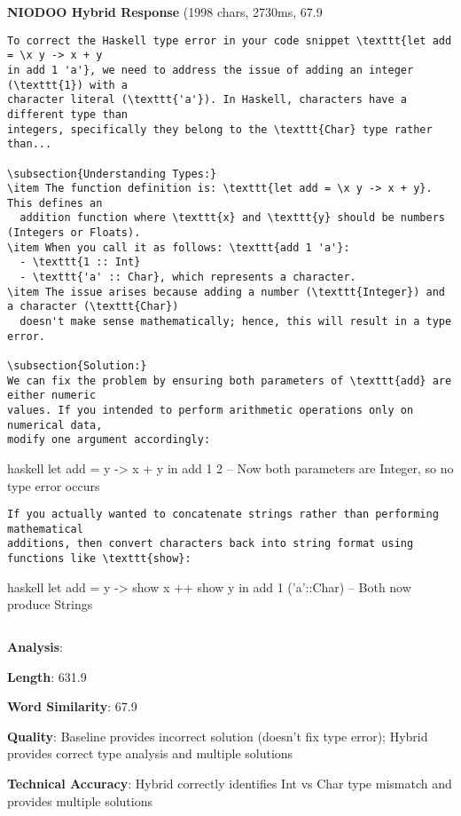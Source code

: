\documentclass[11pt,a4paper]{article}
\begin{document}
\textbf{NIODOO Hybrid Response} (1998 chars, 2730ms, 67.9%
\begin{verbatim}To correct the Haskell type error in your code snippet \texttt{let add = \x y -> x + y 
in add 1 'a'}, we need to address the issue of adding an integer (\texttt{1}) with a 
character literal (\texttt{'a'}). In Haskell, characters have a different type than 
integers, specifically they belong to the \texttt{Char} type rather than...

\subsection{Understanding Types:}
\item The function definition is: \texttt{let add = \x y -> x + y}. This defines an 
  addition function where \texttt{x} and \texttt{y} should be numbers (Integers or Floats).
\item When you call it as follows: \texttt{add 1 'a'}:
  - \texttt{1 :: Int}
  - \texttt{'a' :: Char}, which represents a character.
\item The issue arises because adding a number (\texttt{Integer}) and a character (\texttt{Char}) 
  doesn't make sense mathematically; hence, this will result in a type error.

\subsection{Solution:}
We can fix the problem by ensuring both parameters of \texttt{add} are either numeric 
values. If you intended to perform arithmetic operations only on numerical data, 
modify one argument accordingly:

\end{verbatim}haskell
let add = \x y -> x + y
in add 1 2  -- Now both parameters are Integer, so no type error occurs
\begin{verbatim}
If you actually wanted to concatenate strings rather than performing mathematical 
additions, then convert characters back into string format using functions like \texttt{show}:
\end{verbatim}haskell
let add = \x y -> show x ++ show y
in add 1 ('a'::Char)  -- Both now produce Strings
\begin{verbatim}\end{verbatim}

\textbf{Analysis}:
\item \textbf{Length}: 631.9%
\item \textbf{Word Similarity}: 67.9%
\item \textbf{Quality}: Baseline provides incorrect solution (doesn't fix type error); Hybrid provides correct type analysis and multiple solutions
\item \textbf{Technical Accuracy}: Hybrid correctly identifies Int vs Char type mismatch and provides multiple solutions
\end{document}
